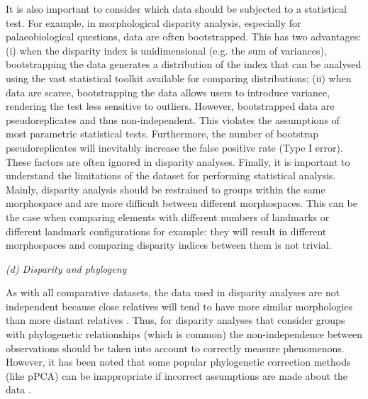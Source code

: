 \documentclass[12pt,letterpaper]{article}
\renewcommand{\subsection}[1]{%
\bigskip
\begin{center}
\begin{large}
\normalfont\itshape #1
\end{large}
\end{center}}
\begin{document}
It is also important to consider which data should be subjected to a statistical test.
For example, in morphological disparity analysis, especially for palaeobiological questions, data are often bootstrapped.
This has two advantages: (i) when the disparity index is unidimensional (e.g. the sum of variances), bootstrapping the data generates a distribution of the index that can be analysed using the vast statistical toolkit available for comparing distributions; (ii) when data are scarce, bootstrapping the data allows users to introduce variance, rendering the test less sensitive to outliers.
However, bootstrapped data are pseudoreplicates and thus non-independent.
This violates the assumptions of most parametric statistical tests.
Furthermore, the number of bootstrap pseudoreplicates will inevitably increase the false positive rate (Type I error).
These factors are often ignored in disparity analyses.
Finally, it is important to understand the limitations of the dataset for performing statistical analysis.
Mainly, disparity analysis should be restrained to groups within the same morphospace and are more difficult between different morphospaces.
This can be the case when comparing elements with different numbers of landmarks or different landmark configurations for example: they will result in different morphospaces and comparing disparity indices between them is not trivial.


\subsection{(d) Disparity and phylogeny}
\label{section:phylo}

As with all comparative datasets, the data used in disparity analyses are not independent because close relatives will tend to have more similar morphologies than more distant relatives \citep{Harvey1998-xg}.
Thus, for disparity analyses that consider groups with phylogenetic relationships (which is common) the non-independence between observations should be taken into account to correctly measure phenomenons.
However, it has been noted that some popular phylogenetic correction methods (like pPCA) can be inappropriate
if incorrect assumptions are made about the data \citep{Uyeda2015}.
\end{document}
